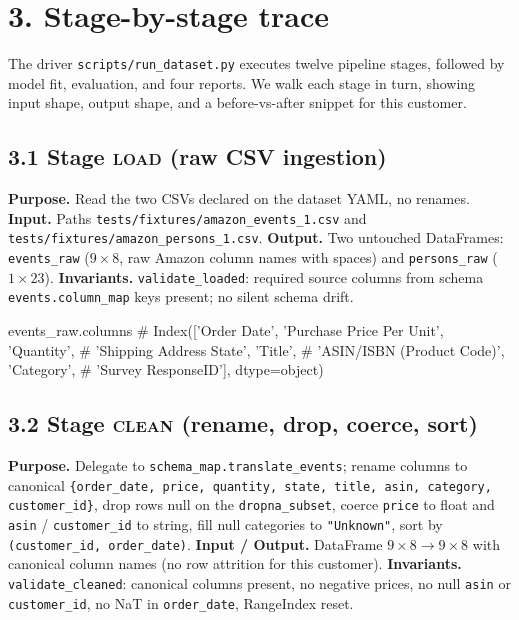 \documentclass[11pt,a4paper]{article}
\begin{document}
\section*{3. Stage-by-stage trace}

The driver \texttt{scripts/run\_dataset.py} executes twelve pipeline
stages, followed by model fit, evaluation, and four reports. We walk
each stage in turn, showing input shape, output shape, and a
before-vs-after snippet for this customer.

\subsection*{3.1 Stage \textsc{load} (raw CSV ingestion)}

\textbf{Purpose.} Read the two CSVs declared on the dataset YAML, no
renames.
\textbf{Input.} Paths \texttt{tests/fixtures/amazon\_events\_1.csv} and
\texttt{tests/fixtures/amazon\_persons\_1.csv}.
\textbf{Output.} Two untouched DataFrames: \texttt{events\_raw}
($9 \times 8$, raw Amazon column names with spaces) and
\texttt{persons\_raw} ($1 \times 23$).
\textbf{Invariants.} \texttt{validate\_loaded}: required source columns
from schema \texttt{events.column\_map} keys present; no silent schema
drift.

\begin{code}
events_raw.columns
# Index(['Order Date', 'Purchase Price Per Unit', 'Quantity',
#        'Shipping Address State', 'Title',
#        'ASIN/ISBN (Product Code)', 'Category',
#        'Survey ResponseID'], dtype=object)
\end{code}

\subsection*{3.2 Stage \textsc{clean} (rename, drop, coerce, sort)}

\textbf{Purpose.} Delegate to \texttt{schema\_map.translate\_events};
rename columns to canonical
\verb|{order_date, price, quantity, state, title, asin, category, customer_id}|,
drop rows null on the \texttt{dropna\_subset}, coerce \texttt{price} to
float and \texttt{asin} / \texttt{customer\_id} to string, fill null
categories to \verb|"Unknown"|, sort by
\texttt{(customer\_id, order\_date)}.
\textbf{Input / Output.} DataFrame $9 \times 8 \to 9 \times 8$ with
canonical column names (no row attrition for this customer).
\textbf{Invariants.} \texttt{validate\_cleaned}: canonical columns
present, no negative prices, no null \texttt{asin} or
\texttt{customer\_id}, no NaT in \texttt{order\_date}, RangeIndex reset.
\end{document}
